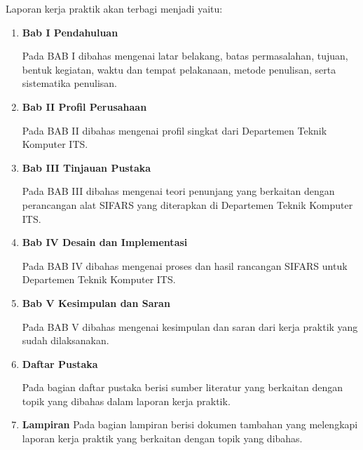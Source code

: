 Laporan kerja praktik akan terbagi menjadi yaitu:

\begin{enumerate}[nolistsep]

  \item \textbf{Bab I Pendahuluan}

  Pada BAB I dibahas mengenai latar belakang, batas permasalahan, tujuan, bentuk kegiatan, waktu dan tempat pelakanaan, metode penulisan, serta sistematika penulisan.

  \item \textbf{Bab II Profil Perusahaan}

  Pada BAB II dibahas mengenai profil singkat dari Departemen Teknik Komputer ITS.

  \item \textbf{Bab III Tinjauan Pustaka}

  Pada BAB III dibahas mengenai teori penunjang yang berkaitan dengan perancangan alat SIFARS yang diterapkan di Departemen Teknik Komputer ITS.

  \item \textbf{Bab IV Desain dan Implementasi}

  Pada BAB IV dibahas mengenai proses dan hasil rancangan SIFARS untuk Departemen Teknik Komputer ITS.

  \item \textbf{Bab V Kesimpulan dan Saran}

  Pada BAB V dibahas mengenai kesimpulan dan saran dari kerja praktik yang sudah dilaksanakan.

  \item \textbf{Daftar Pustaka}

  Pada bagian daftar pustaka berisi sumber literatur yang berkaitan dengan topik yang dibahas dalam laporan kerja praktik.
  
   \item \textbf{Lampiran}
   Pada bagian lampiran berisi dokumen tambahan yang melengkapi laporan kerja praktik yang berkaitan dengan topik yang dibahas.



\end{enumerate}
